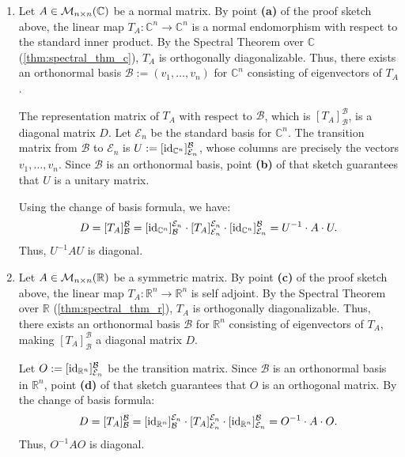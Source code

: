 \begin{exercisesolution}
\label{sol:spectral_thm_matrices}
\begin{enumerate}[label=\textbf{(\alph*)}]
    \item Let $A \in \mathcal{M}_{n \times n}(\mathbb{C})$ be a normal matrix. By point \textbf{(a)} of the proof sketch above, the linear map $T_A \colon \mathbb{C}^n \to \mathbb{C}^n$ is a normal endomorphism with respect to the standard inner product. By the Spectral Theorem over $\mathbb{C}$ (\cref{thm:spectral_thm_c}), $T_A$ is orthogonally diagonalizable. Thus, there exists an orthonormal basis $\mathcal{B} := (v_1, \dots, v_n)$ for $\mathbb{C}^n$ consisting of eigenvectors of $T_A$. 
    
    The representation matrix of $T_A$ with respect to $\mathcal{B}$, which is $[T_A]_{\mathcal{B}}^{\mathcal{B}}$, is a diagonal matrix $D$. Let $\mathcal{E}_n$ be the standard basis for $\mathbb{C}^n$. The transition matrix from $\mathcal{B}$ to $\mathcal{E}_n$ is $U := [\operatorname{id}_{\mathbb{C}^n}]_{\mathcal{E}_n}^{\mathcal{B}}$, whose columns are precisely the vectors $v_1, \dots, v_n$. Since $\mathcal{B}$ is an orthonormal basis, point \textbf{(b)} of that sketch guarantees that $U$ is a unitary matrix. 
    
    Using the change of basis formula, we have:
    \[
        D = [T_A]_{\mathcal{B}}^{\mathcal{B}} = [\operatorname{id}_{\mathbb{C}^n}]_{\mathcal{B}}^{\mathcal{E}_n} \cdot [T_A]_{\mathcal{E}_n}^{\mathcal{E}_n} \cdot [\operatorname{id}_{\mathbb{C}^n}]_{\mathcal{E}_n}^{\mathcal{B}} = U^{-1} \cdot A \cdot U.
    \]
    Thus, $U^{-1} A U$ is diagonal.
    
    \item Let $A \in \mathcal{M}_{n \times n}(\mathbb{R})$ be a symmetric matrix. By point \textbf{(c)} of the proof sketch above, the linear map $T_A \colon \mathbb{R}^n \to \mathbb{R}^n$ is self adjoint. By the Spectral Theorem over $\mathbb{R}$ (\cref{thm:spectral_thm_r}), $T_A$ is orthogonally diagonalizable. Thus, there exists an orthonormal basis $\mathcal{B}$ for $\mathbb{R}^n$ consisting of eigenvectors of $T_A$, making $[T_A]_{\mathcal{B}}^{\mathcal{B}}$ a diagonal matrix $D$. 
    
    Let $O := [\operatorname{id}_{\mathbb{R}^n}]_{\mathcal{E}_n}^{\mathcal{B}}$ be the transition matrix. Since $\mathcal{B}$ is an orthonormal basis in $\mathbb{R}^n$, point \textbf{(d)} of that sketch guarantees that $O$ is an orthogonal matrix. 
    By the change of basis formula:
    \[
        D = [T_A]_{\mathcal{B}}^{\mathcal{B}} = [\operatorname{id}_{\mathbb{R}^n}]_{\mathcal{B}}^{\mathcal{E}_n} \cdot [T_A]_{\mathcal{E}_n}^{\mathcal{E}_n} \cdot [\operatorname{id}_{\mathbb{R}^n}]_{\mathcal{E}_n}^{\mathcal{B}} = O^{-1} \cdot A \cdot O.
    \]
    Thus, $O^{-1} A O$ is diagonal.
\end{enumerate}
\end{exercisesolution}

